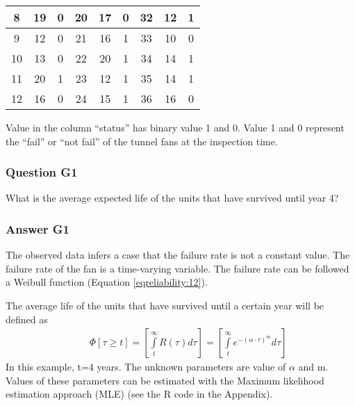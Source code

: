 \begin{table}[h]
\begin{tabular}{|l|l|l|l|l|l|l|l|l|}
\hline
\multicolumn{1}{|c|}{8} & \multicolumn{1}{c|}{19} & \multicolumn{1}{c|}{0} & \multicolumn{1}{c|}{20} & \multicolumn{1}{c|}{17} & \multicolumn{1}{c|}{0} & \multicolumn{1}{c|}{32} & \multicolumn{1}{c|}{12} & \multicolumn{1}{c|}{1} \\ 
\hline
\multicolumn{1}{|c|}{9} & \multicolumn{1}{c|}{12} & \multicolumn{1}{c|}{0} & \multicolumn{1}{c|}{21} & \multicolumn{1}{c|}{16} & \multicolumn{1}{c|}{1} & \multicolumn{1}{c|}{33} & \multicolumn{1}{c|}{10} & \multicolumn{1}{c|}{0} \\ 
\hline
\multicolumn{1}{|c|}{10} & \multicolumn{1}{c|}{13} & \multicolumn{1}{c|}{0} & \multicolumn{1}{c|}{22} & \multicolumn{1}{c|}{20} & \multicolumn{1}{c|}{1} & \multicolumn{1}{c|}{34} & \multicolumn{1}{c|}{14} & \multicolumn{1}{c|}{1} \\ 
\hline
\multicolumn{1}{|c|}{11} & \multicolumn{1}{c|}{20} & \multicolumn{1}{c|}{1} & \multicolumn{1}{c|}{23} & \multicolumn{1}{c|}{12} & \multicolumn{1}{c|}{1} & \multicolumn{1}{c|}{35} & \multicolumn{1}{c|}{14} & \multicolumn{1}{c|}{1} \\ 
\hline
\multicolumn{1}{|c|}{12} & \multicolumn{1}{c|}{16} & \multicolumn{1}{c|}{0} & \multicolumn{1}{c|}{24} & \multicolumn{1}{c|}{15} & \multicolumn{1}{c|}{1} & \multicolumn{1}{c|}{36} & \multicolumn{1}{c|}{16} & \multicolumn{1}{c|}{0} \\ 
\hline
\end{tabular}
\label{tbl-reliability-a:13}
\end{table}
Value in the column ``status'' has binary value 1 and 0. Value 1 and 0 represent
the ``fail'' or ``not fail'' of the tunnel fans at the inspection time.
\subsubsection{Question G1}
What is the average expected life of the units that have survived until year 4?
\subsubsection{Answer G1}
The observed data infers a case that the failure rate is not a constant value.
The failure rate of the fan is a time-varying variable. The failure rate can be
followed a Weibull function (Equation \eqref{eqreliability:12}).

The average life of the units that have survived until a certain year will be
defined as
\begin{eqnarray}
&& \Phi \left[ {\tau  \ge t} \right] = \left[ {\int\limits_t^\infty  {R(\tau )d\tau
} } \right] = \left[ {\int\limits_t^\infty  {{e^{ - {{(\alpha  \cdot \tau
)}^m}}}d\tau } } \right]
\label{eq-reliability-a44}
\end{eqnarray}
In this example, t=4 years. The unknown parameters are value of $\alpha $ and m.
Values of these parameters can be estimated with the Maximum likelihood
estimation approach (MLE) (see the R code in the Appendix).

